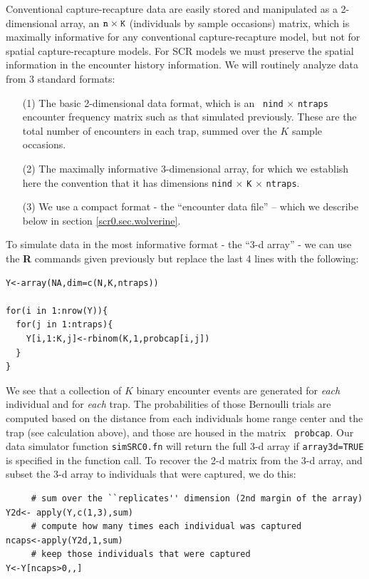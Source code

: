 Conventional capture-recapture data are easily stored and manipulated
as a 2-dimensional array, an $\mbox{\tt n} \times \mbox{\tt
  K}$ (individuals by sample occasions) matrix, which is maximally informative for any
conventional capture-recapture model, but not for spatial
capture-recapture models.  For SCR models we must preserve the spatial
information in the encounter history information. We will routinely
analyze data from 3 standard formats:
\begin{itemize}
\item[(1)] The basic 2-dimensional data format, which is an \mbox{\tt
    nind} $\times$ \mbox{\tt ntraps} encounter frequency matrix such
  as that simulated previously. These are the total number of encounters in each
  trap, summed over the $K$ sample occasions.
\item[(2)] The maximally informative 3-dimensional array, for which we
  establish here the convention that it has dimensions \mbox{\tt nind}
  $\times$ \mbox{\tt K} $\times$ \mbox{\tt ntraps}.
\item[(3)] We use a compact format - the ``encounter data file'' -- which
  we describe below in section \ref{scr0.sec.wolverine}.
\end{itemize}
To simulate data in the most informative format - the ``3-d array'' -
we can use the {\bf R} commands given previously but replace the last
4 lines with the following:
{\small
\begin{verbatim}
Y<-array(NA,dim=c(N,K,ntraps))

for(i in 1:nrow(Y)){
  for(j in 1:ntraps){
    Y[i,1:K,j]<-rbinom(K,1,probcap[i,j])
  }
}
\end{verbatim}
} 

We see that a collection of $K$ binary encounter events are
generated for {\it each} individual and for {\it each} trap.  The
probabilities of those Bernoulli trials are computed based on the
distance from each individuals home range center and the trap (see
calculation above), and those are housed in the matrix \mbox{\tt
  probcap}. Our data simulator function \mbox{\tt simSRC0.fn} will
return the full 3-d array if \mbox{\tt array3d=TRUE} is specified in
the function call.  To recover the 2-d matrix from the 3-d array, and
subset the 3-d array to individuals that were captured, we do this:
{\small
\begin{verbatim}
     # sum over the ``replicates'' dimension (2nd margin of the array)
Y2d<- apply(Y,c(1,3),sum) 
     # compute how many times each individual was captured
ncaps<-apply(Y2d,1,sum)   
     # keep those individuals that were captured
Y<-Y[ncaps>0,,]           
\end{verbatim}
}

